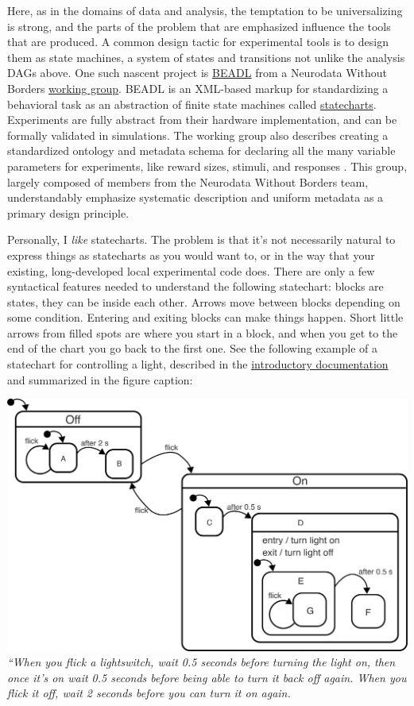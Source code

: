 \documentclass[10pt]{tufte-book}
\begin{document}
Here, as in the domains of data and analysis, the temptation to be
universalizing is strong, and the parts of the problem that are
emphasized influence the tools that are produced. A common design tactic
for experimental tools is to design them as state machines, a system of
states and transitions not unlike the analysis DAGs above. One such
nascent project is
\href{https://archive.org/details/beadl-xml-documentation-v-0.1/mode/2up}{BEADL}
\citep{wulfBEADLXMLDocumentation2020}  from a Neurodata Without
Borders
\href{https://archive.org/details/nwb-behavioral-task-wg}{working
group}. BEADL is an XML-based markup for standardizing a behavioral task
as an abstraction of finite state machines called
\href{https://statecharts.github.io/}{statecharts}. Experiments are
fully abstract from their hardware implementation, and can be formally
validated in simulations. The working group also describes creating a
standardized ontology and metadata schema for declaring all the many
variable parameters for experiments, like reward sizes, stimuli, and
responses \citep{nwbbehavioraltaskwgNWBBehavioralTask2020} . This
group, largely composed of members from the Neurodata Without Borders
team, understandably emphasize systematic description and uniform
metadata as a primary design principle.

Personally, I \emph{like} statecharts. The problem is that it's not
necessarily natural to express things as statecharts as you would want
to, or in the way that your existing, long-developed local experimental
code does. There are only a few syntactical features needed to
understand the following statechart: blocks are states, they can be
inside each other. Arrows move between blocks depending on some
condition. Entering and exiting blocks can make things happen. Short
little arrows from filled spots are where you start in a block, and when
you get to the end of the chart you go back to the first one. See the
following example of a statechart for controlling a light, described in
the \href{https://statecharts.dev/on-off-statechart.html}{introductory
documentation} and summarized in the figure caption:

\includegraphics[width=\linewidth]{../assets/images/on-off-delayed-exit-1.png}
\emph{``When you flick a lightswitch, wait 0.5 seconds before turning
the light on, then once it's on wait 0.5 seconds before being able to
turn it back off again. When you flick it off, wait 2 seconds before you
can turn it on again.}
\end{document}
